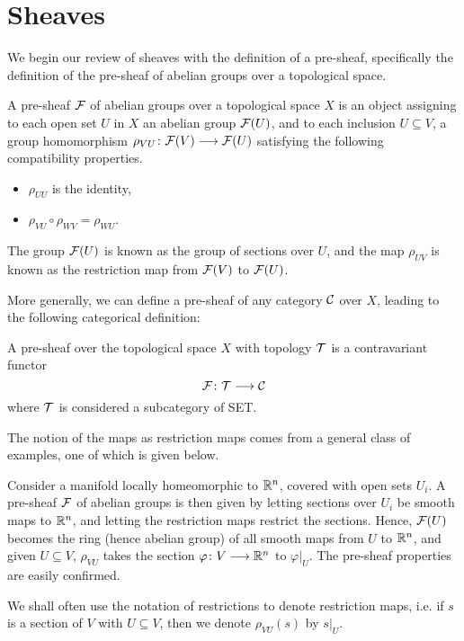 \documentclass[a4paper]{amsart}
\begin{document}
\section{Sheaves}
We begin our review of sheaves with the definition of a pre-sheaf, specifically the definition of the pre-sheaf of abelian groups over a topological space.
\begin{Definition}
    A pre-sheaf $\mathcal{F}$ of abelian groups over a topological space $X$ is an object assigning to each open set $U$ in $X$ an abelian group $\mathcal{F}(U)$, and to each inclusion $U\subseteq V$, a group homomorphism $\rho_{VU}\colon\mathcal{F}(V)\longrightarrow \mathcal{F}(U)$ satisfying the following compatibility properties.
    \begin{itemize}
        \item $\rho_{UU}$ is the identity,
        \item $\rho_{VU} \circ \rho_{WV} = \rho_{WU}$.
    \end{itemize}
    The group $\mathcal{F}(U)$ is known as the group of sections over $U$, and the map $\rho_{UV}$ is known as the restriction map from $\mathcal{F}(V)$ to $\mathcal{F}(U)$.
\end{Definition}
More generally, we can define a pre-sheaf of any category $\mathcal{C}$ over $X$, leading to the following categorical definition:
\begin{Definition}
    A pre-sheaf over the topological space $X$ with topology $\mathcal{T}$ is a contravariant functor
    \[
        \mathcal{F}\colon\mathcal{T}\longrightarrow \mathcal{C}
    \]
    where $\mathcal{T}$ is considered a subcategory of SET.
\end{Definition}
The notion of the maps as restriction maps comes from a general class of examples, one of which is given below.


\begin{Example}
    Consider a manifold locally homeomorphic to $\mathbb{R}^n$, covered with open sets $U_i$. A pre-sheaf $\mathcal{F}$ of abelian groups is then given by letting sections over $U_i$ be smooth maps to $\mathbb{R}^n$, and letting the restriction maps restrict the sections. Hence, $\mathcal{F}(U)$ becomes the ring (hence abelian group) of all smooth maps from $U$ to $\mathbb{R}^n$, and given $U\subseteq V$, $\rho_{VU}$ takes the section $\varphi\colon V\longrightarrow \mathbb{R}^n$ to $\varphi|_U$. The pre-sheaf properties are easily confirmed.
\end{Example}
We shall often use the notation of restrictions to denote restriction maps, i.e. if $s$ is a section of $V$ with $U\subseteq V$, then we denote $\rho_{VU}(s)$ by $s|_U$.
\end{document}
